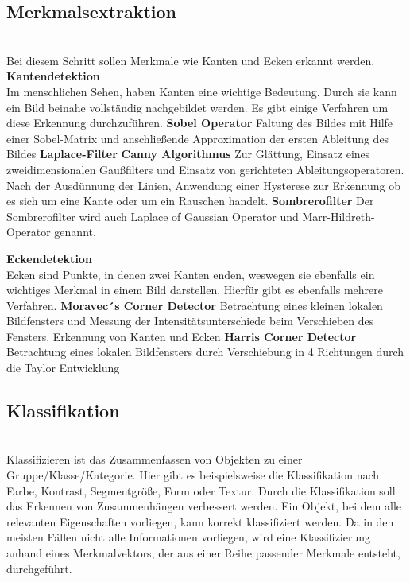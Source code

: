     \subsection*{Merkmalsextraktion}\\
    Bei diesem Schritt sollen Merkmale wie Kanten und Ecken erkannt werden.
    \textbf{Kantendetektion}\\
    Im menschlichen Sehen, haben Kanten eine wichtige Bedeutung. Durch sie kann ein Bild beinahe vollständig nachgebildet werden. Es gibt einige Verfahren um diese Erkennung durchzuführen.
    \textbf{Sobel Operator} Faltung des Bildes mit Hilfe einer Sobel-Matrix und anschließende Approximation der ersten Ableitung des Bildes
    \textbf{Laplace-Filter}
    \textbf{Canny Algorithmus} Zur Glättung, Einsatz eines zweidimensionalen Gaußfilters und Einsatz von gerichteten Ableitungsoperatoren. Nach der Ausdünnung der Linien, Anwendung einer Hysterese zur Erkennung ob es sich um eine Kante oder um ein Rauschen handelt.
    \textbf{Sombrerofilter} Der Sombrerofilter wird auch Laplace of Gaussian Operator und Marr-Hildreth-Operator genannt.

    \textbf{Eckendetektion}\\
    Ecken sind Punkte, in denen zwei Kanten enden, weswegen sie ebenfalls ein wichtiges Merkmal in einem Bild darstellen. Hierfür gibt es ebenfalls mehrere Verfahren.
    \textbf{Moravec´s Corner Detector} Betrachtung eines kleinen lokalen Bildfensters und Messung der Intensitätsunterschiede beim Verschieben des Fensters. Erkennung von Kanten und Ecken
    \textbf{Harris Corner Detector} Betrachtung eines lokalen Bildfensters durch Verschiebung in 4 Richtungen durch die Taylor Entwicklung


    \subsection*{Klassifikation}\\ 
    Klassifizieren ist das Zusammenfassen von Objekten zu einer Gruppe/Klasse/Kategorie. Hier gibt es beispielsweise die Klassifikation nach Farbe, Kontrast, Segmentgröße, Form oder Textur. Durch die Klassifikation soll das Erkennen von Zusammenhängen verbessert werden. Ein Objekt, bei dem alle relevanten Eigenschaften vorliegen, kann korrekt klassifiziert werden. Da in den meisten Fällen nicht alle Informationen vorliegen, wird eine Klassifizierung anhand eines Merkmalvektors, der aus einer Reihe passender Merkmale entsteht, durchgeführt. \cite{Bildverarbeitung}
   
